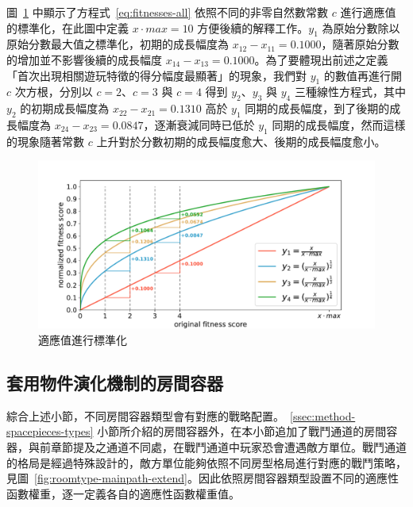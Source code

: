 圖~\ref{fig:fitnesses-normalized} 中顯示了方程式~\ref{eq:fitnesses-all} 依照不同的非零自然數常數 $c$ 進行適應值的標準化，在此圖中定義 $x\cdot max = 10$ 方便後續的解釋工作。$y_{1}$ 為原始分數除以原始分數最大值之標準化，初期的成長幅度為 $x_{12} - x_{11} = 0.1000$，隨著原始分數的增加並不影響後續的成長幅度 $x_{14} - x_{13} = 0.1000$。為了要體現出前述之定義「首次出現相關遊玩特徵的得分幅度最顯著」的現象，我們對 $y_{1}$ 的數值再進行開 $c$ 次方根，分別以 $c = 2$、$c = 3$ 與 $c = 4$ 得到 $y_{2}$、$y_{3}$ 與 $y_{4}$ 三種線性方程式，其中 $y_{2}$ 的初期成長幅度為 $x_{22} - x_{21} = 0.1310$ 高於 $y_{1}$ 同期的成長幅度，到了後期的成長幅度為 $x_{24} - x_{23} = 0.0847$，逐漸衰減同時已低於 $y_{1}$ 同期的成長幅度，然而這樣的現象隨著常數 $c$ 上升對於分數初期的成長幅度愈大、後期的成長幅度愈小。

\begin{figure}[!htb]
  \begin{center}
    \includegraphics[width=1.0\textwidth]{figures/fitnesses-normalized.pdf}
    \caption{適應值進行標準化}
    \label{fig:fitnesses-normalized}
  \end{center}
\end{figure}

\subsection{套用物件演化機制的房間容器}
\label{ssec:method-segments-appliedonvolumes}

綜合上述小節，不同房間容器類型會有對應的戰略配置。~\ref{ssec:method-spacepieces-types} 小節所介紹的房間容器外，在本小節追加了戰鬥通道的房間容器，與前章節提及之通道不同處，在戰鬥通道中玩家恐會遭遇敵方單位。戰鬥通道的格局是經過特殊設計的，敵方單位能夠依照不同房型格局進行對應的戰鬥策略，見圖~\ref{fig:roomtype-mainpath-extend}。因此依照房間容器類型設置不同的適應性函數權重，逐一定義各自的適應性函數權重值。

